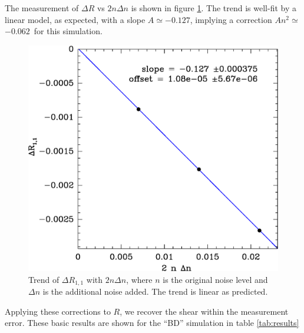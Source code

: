 \documentclass[usegraphicx,usenatbib]{mn2e}
\newcommand{\Aslope}{$-0.127$}
\newcommand{\Rcorr}{$-0.062$}
\begin{document}
The measurement of $\Delta R$ vs $2 n \Delta n$ is shown in figure
\ref{fig:detrend}.  The trend is well-fit by a linear model, as expected, with
a slope $A \simeq $\Aslope, implying a correction $A n^2 \simeq$ \Rcorr\ for this
simulation.

\begin{figure}
    \includegraphics[scale=0.45]{run-bd13mcal-dt02-Rnoise-detrend-R11.eps}

    \caption{Trend of $\Delta R_{1,1}$ with $2 n \Delta n$, where $n$ is the
    original noise level and $\Delta n$ is the additional noise added.  The
trend is linear  as predicted.}

\label{fig:detrend}
\end{figure}

Applying these corrections to $R$, we recover the shear within the
measurement error. These basic results are shown for the ``BD'' simulation
in table \ref{tab:results}
\end{document}

